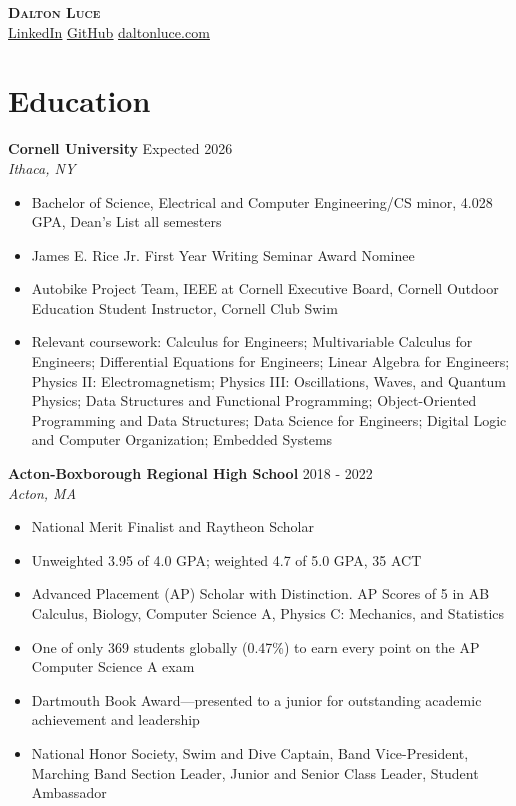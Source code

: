 \documentclass[letterpaper,8pt]{article}
\newcommand{\resumeEntry}[4]{
    \vspace{4pt}
    \large \textbf{#1}
    \normalsize \hfill #2
    \\
    \textit{#3} \hfill \textit{#4}
    \vspace{1pt}
}
\newcommand{\itemsBegin}{
    \begin{itemize}[leftmargin=0.2in, labelsep=0.05in, itemsep=0pt, parsep=1pt, topsep=0pt, partopsep=0pt]
}
\newcommand{\itemsEnd}{\end{itemize}}
\begin{document}
\textbf{\huge \scshape Dalton Luce} \\
\vspace{2pt}
\small
\addressConditional
\phoneConditional
\emailConditional
\href{https://www.linkedin.com/in/dalton-luce/}{\underline{LinkedIn}}
\hspace{10pt}
\href{https://github.com/da-luce}{\underline{GitHub}}
\hspace{10pt}
\href{https://daltonluce.com/}{\underline{daltonluce.com}}
\vspace{-5pt}

\section{Education}

    \resumeEntry
        {Cornell University}
        {Expected 2026}
        {}
        {Ithaca, NY}

    \itemsBegin
        \item Bachelor of Science, Electrical and Computer Engineering/CS minor, 4.028 GPA, Dean’s List all semesters
        \item James E. Rice Jr. First Year Writing Seminar Award Nominee
        \item Autobike Project Team, IEEE at Cornell Executive Board, Cornell Outdoor Education Student Instructor, Cornell Club Swim
        \item Relevant coursework: Calculus for Engineers; Multivariable Calculus for Engineers; Differential Equations for Engineers; Linear Algebra for Engineers; Physics II: Electromagnetism; Physics III: Oscillations, Waves, and Quantum Physics; Data Structures and Functional Programming; Object-Oriented Programming and Data Structures; Data Science for Engineers; Digital Logic and Computer Organization; Embedded Systems
    \itemsEnd

    \resumeEntry
        {Acton-Boxborough Regional High School}
        {2018 - 2022}
        {}
        {Acton, MA}

    \itemsBegin
        \item National Merit Finalist and Raytheon Scholar
        \item Unweighted 3.95 of 4.0 GPA; weighted 4.7 of 5.0 GPA, 35 ACT
        \item Advanced Placement (AP) Scholar with Distinction. AP Scores of 5 in AB Calculus, Biology, Computer Science A, Physics C: Mechanics, and Statistics
        \item One of only 369 students globally (0.47\%) to earn every point on the AP Computer Science A exam
        \item Dartmouth Book Award—presented to a junior for outstanding academic achievement and leadership
        \item National Honor Society, Swim and Dive Captain, Band Vice-President, Marching Band Section Leader, Junior and Senior Class Leader, Student Ambassador
    \itemsEnd
\end{document}
